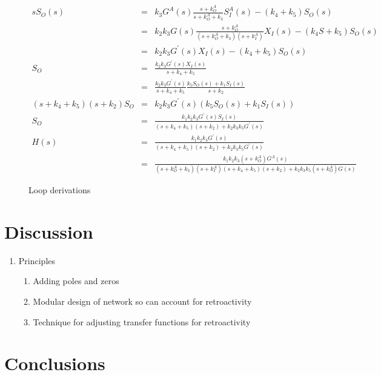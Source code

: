 \documentclass[unnumsec,webpdf,contemporary,large]{oup-authoring-template}%
\theoremstyle{thmstyleone}%
\theoremstyle{thmstyletwo}%
\theoremstyle{thmstylethree}%
\begin{document}
\begin{figure}
\begin{eqnarray}
s S_O (s) & = & k_3   G^A(s) \frac{s + k^A_O}{ s + k^A_O + k_3}  S^A_I(s) - (k_4  + k_5) S_O (s) \nonumber \\
& = &
  k_2 k_3  G(s) \frac{s + k^A_O}{(s + k^A_O + k_3)(s + k^A_I)} X_I(s)
   -(k_4 S + k_5 )S_O (s) \nonumber \\
& = &
k_2 k_3  G^{\prime}(s)X_I(s) - (k_4 + k_5) S_O(s)  \nonumber \\
S_O & = &  \frac{k_2 k_3  G^{\prime}(s) X_I(s)}{s + k_4 + k_5  }  \nonumber \\
    & = &  \frac{k_2 k_3  G^{\prime}(s)}{s + k_4 + k_5  } \frac{k_5 S_O(s) + k_1 S_I (s)}{s + k_2} \nonumber \\
(s + k_4 + k_5)(s + k_2)S_O & = &
   k_2 k_3  G^{\prime}(s) (k_5 S_O(s) + k_1 S_I(s))
    \nonumber \\
S_O & = &  \frac{k_1 k_2 k_3  G^{\prime}(s) S_I(s)}{(s + k_4 + k_5)(s + k_2) + k_2 k_3 k_5 G^{\prime}(s)} \nonumber \nonumber \\
H(s) & = & \frac{k_1 k_2 k_3  G^{\prime}(s)}{(s + k_4 + k_5)(s + k_2) + k_2 k_3 k_5 G^{\prime}(s)} \nonumber \\
    & = & \frac{k_1 k_2 k_3  (s + k^A_O) G^A(s)}{(s + k^A_O + k_3)(s + k^A_I)(s + k_4 + k_5)(s + k_2) + k_2 k_3 k_5 (s + k^A_O)G(s)}
\end{eqnarray}
\caption{Loop derivations}\label{fig:loop-derivation}
\end{figure}

\section{Discussion}\label{discussion}
\begin{enumerate}

\item
Principles
\begin{enumerate}
\item 
Adding poles and zeros
\item
Modular design of network so can account for retroactivity
\item
Technique for adjusting transfer functions for retroactivity
\end{enumerate}

\end{enumerate}

\section{Conclusions}
\end{document}
